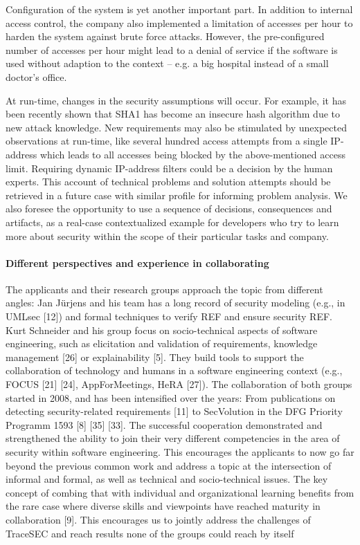 Configuration of the system is yet another important part. In addition to internal access control, the company also implemented a limitation of accesses per hour to harden the system against brute force attacks. However, the pre-configured number of accesses per hour might lead to a denial of service if the software is used without adaption to the context – e.g. a big hospital instead of a small doctor’s office.

At run-time, changes in the security assumptions will occur. For example, it has been recently shown that SHA1 has become an insecure hash algorithm due to new attack knowledge. New requirements may also be stimulated by unexpected observations at run-time, like several hundred access attempts from a single IP-address which leads to all accesses being blocked by the above-mentioned access limit. Requiring dynamic IP-address filters could be a decision by the human experts. This account of technical problems and solution attempts should be retrieved in a future case with similar profile for informing problem analysis. We also foresee the opportunity to use a sequence of decisions, consequences and artifacts, as a real-case contextualized example for developers who try to learn more about security within the scope of their particular tasks and company.

\paragraph*{Different perspectives and experience in collaborating}
The applicants and their research groups approach the topic from different angles: Jan Jürjens and his team has a long record of security modeling (e.g., in UMLsec [12]) and formal techniques to verify REF and ensure security REF. Kurt Schneider and his group focus on socio-technical aspects of software engineering, such as elicitation and validation of requirements, knowledge management [26] or explainability [5]. They build tools to support the collaboration of technology and humans in a software engineering context (e.g., FOCUS [21] [24], AppForMeetings, HeRA [27]). The collaboration of both groups started in 2008, and has been intensified over the years: From publications on detecting security-related requirements [11] to SecVolution in the DFG Priority Programm 1593  [8] [35] [33]. The successful cooperation demonstrated and strengthened the ability to join their very different competencies in the area of security within software engineering. This encourages the applicants to now go far beyond the previous common work and address a topic at the intersection of informal and formal, as well as technical and socio-technical issues. The key concept of combing that with individual and organizational learning benefits from the rare case where diverse skills and viewpoints have reached maturity in collaboration [9]. This encourages us to jointly address the challenges of TraceSEC and reach results none of the groups could reach by itself
